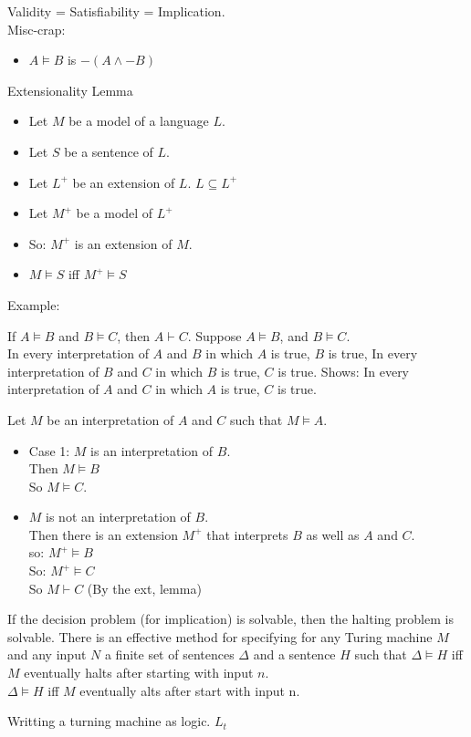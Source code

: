 Validity = Satisfiability = Implication.\\

Misc-crap:
\begin{itemize}
\item $A \vDash B$ is $-(A \wedge -B)$
\end{itemize}

\begin{lemma}
Extensionality Lemma\\
\begin{itemize}
\item Let $M$ be a model of a language $L$.
\item Let $S$ be a sentence of $L$.
\item Let $L^+$ be an extension of $L$. $L \subseteq L^+$
\item Let $M^+$ be a model of $L^+$
\item So: $M^+$ is an extension of $M$.
\item $M \vDash S$ iff $ M^+ \vDash S$
\end{itemize}
\end{lemma}
Example:

If $A \vDash B$ and $B \vDash C$, then $A \vdash C$.
Suppose $A \vDash B$, and $B \vDash C$.\\
In every interpretation of $A$ and $B$ in which $A$ is true, $B$ is true,
In every interpretation of $B$ and $C$ in which $B$ is true, $C$ is true.
Shows: In every interpretation of $A$ and $C$ in which $A$ is true, $C$ is true.

Let $M$ be an interpretation of $A$ and $C$ such that $M \vDash A$.
\begin{itemize}
\item Case 1:
$M$ is an interpretation of $B$. \\
Then $M \vDash B$ \\
So $M \vDash C$. \\
\item $M$ is not an interpretation of $B$. \\
Then there is an extension $M^+$ that interprets $B$ as well as $A$ and $C$. \\
so: $M^+ \vDash B$ \\
So: $M^+ \vDash C$ \\
So $M \vdash C$ (By the ext, lemma) \\
\end{itemize}


\begin{lemma}[Undecibality]
If the decision problem (for implication) is solvable, then the halting problem is solvable.
There is an effective method for specifying for any Turing machine $M$ and any input $N$ a finite set of sentences $\Delta$ and a sentence $H$ such that $\Delta \vDash H$ iff $M$ eventually halts after starting with input $n$. \\
$\Delta \vDash H$ iff $M$ eventually alts after start with input n.\\
\end{lemma}
\large{Writting a turning machine as logic. $L_t$}\\

